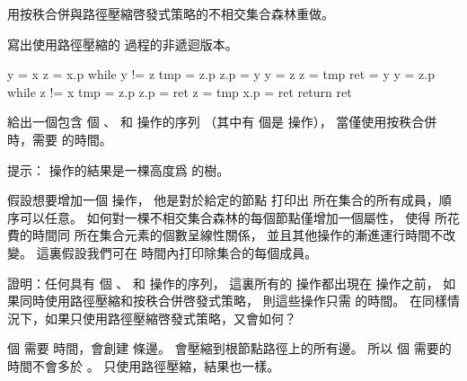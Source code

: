 \startsection[
  title={Disjoint-set forests},
  reference=section:disjoint_set_forests,
]

\startEXERCISE
用按秩合併與路徑壓縮啓發式策略的不相交集合森林重做。
\stopEXERCISE

\startANSWER
{}
\stopANSWER

\startEXERCISE
寫出使用路徑壓縮的  過程的非遞迴版本。
\stopEXERCISE

\startANSWER
{}
\startCLRS
y = x
z = x.p
while y != z
	tmp = z.p
	z.p = y
	y = z
	z = tmp
ret = y
y = z.p
while z != x
	tmp = z.p
	z.p = ret
	z = tmp
x.p = ret
return ret
\stopCLRS
\stopANSWER

\startEXERCISE
給出一個包含  個 、  和  操作的序列
（其中有  個是  操作），
當僅使用按秩合併時，需要  的時間。
\stopEXERCISE

\startANSWER
提示：  操作的結果是一棵高度爲  的樹。
\stopANSWER

\startEXERCISE
假設想要增加一個  操作，
他是對於給定的節點  打印出  所在集合的所有成員，順序可以任意。
如何對一棵不相交集合森林的每個節點僅增加一個屬性，
使得  所花費的時間同  所在集合元素的個數呈線性關係，
並且其他操作的漸進運行時間不改變。
這裏假設我們可在  時間內打印除集合的每個成員。
\stopEXERCISE

\startANSWER
{}
\stopANSWER

\startEXERCISE\DIFFICULT
證明：任何具有  個 、  和  操作的序列，
這裏所有的  操作都出現在  操作之前，
如果同時使用路徑壓縮和按秩合併啓發式策略，
則這些操作只需  的時間。
在同樣情況下，如果只使用路徑壓縮啓發式策略，又會如何？
\stopEXERCISE

\startANSWER
{} 個  需要  時間，會創建  條邊。
  會壓縮到根節點路徑上的所有邊。
所以  個  需要的時間不會多於 。
只使用路徑壓縮，結果也一樣。
\stopANSWER

\stopsection
